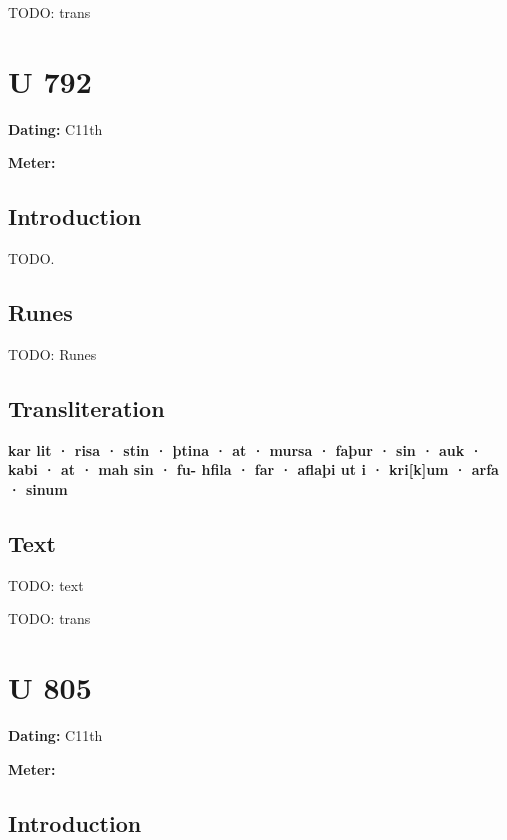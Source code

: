 \bpb TODO: trans\epb\epg

\sectionline\clearpage


\section{U 792}

\begin{flushright}%
\textbf{Dating:} C11th

\textbf{Meter:} \Fornyrdislag
\end{flushright}%

\subsection{Introduction}

TODO.

\subsection{Runes}

TODO: Runes%

\subsection{Transliteration}

\textbf{kar lit · risa · stin · þtina · at · mursa · faþur · sin · auk · kabi · at · mah sin · fu- hfila · far · aflaþi ut i · kri[k]um · arfa · sinum}

\subsection{Text}

\bpg\bpa[0]%
TODO: text\epa

\bpb TODO: trans\epb\epg

\sectionline\clearpage


\section{U 805}

\begin{flushright}%
\textbf{Dating:} C11th

\textbf{Meter:} \Fornyrdislag
\end{flushright}%

\subsection{Introduction}

